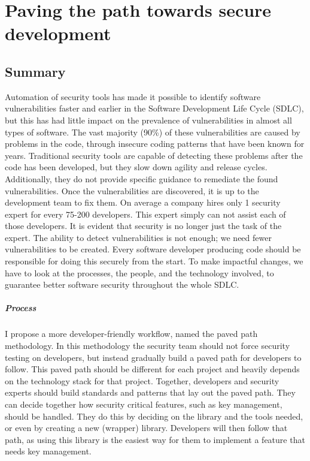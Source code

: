\chapter*{Paving the path towards secure development}
\section*{Summary}

Automation of security tools has made it possible to identify software vulnerabilities faster and earlier in the Software Development Life Cycle (SDLC), but this has had little impact on the prevalence of vulnerabilities in almost all types of software.
The vast majority (90\%) of these vulnerabilities are caused by problems in the code, through insecure coding patterns that have been known for years.
Traditional security tools are capable of detecting these problems after the code has been developed, but they slow down agility and release cycles. 
Additionally, they do not provide specific guidance to remediate the found vulnerabilities.
Once the vulnerabilities are discovered, it is up to the development team to fix them.
On average a company hires only 1 security expert for every 75-200 developers.
This expert simply can not assist each of those developers.
It is evident that security is no longer just the task of the expert.
The ability to detect vulnerabilities is not enough; we need fewer vulnerabilities to be created.
Every software developer producing code should be responsible for doing this securely from the start.
To make impactful changes, we have to look at the processes, the people, and the technology involved, to guarantee better software security throughout the whole SDLC.

\paragraph{Process}
I propose a more developer-friendly workflow, named the paved path methodology.
In this methodology the security team should not force security testing on developers, but instead gradually build a paved path for developers to follow.
This paved path should be different for each project and heavily depends on the technology stack for that project.
Together, developers and security experts should build
standards and patterns that lay out the paved path.
They can decide together how security critical features, such as key management, should be handled.
They do this by deciding on the library and the tools needed, or even by creating a new (wrapper) library.
Developers will then follow that path, as using this library is the easiest way for them to implement a feature that needs key management.

